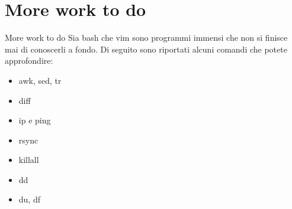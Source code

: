 \documentclass{beamer}
\begin{document}
\section{More work to do}
\begin{frame}{More work to do}
  Sia bash che vim sono programmi immensi che non si finisce mai di conoscerli a
  fondo. Di seguito sono riportati alcuni comandi che potete approfondire: 
  \medskip
  \begin{itemize}
    \item awk, sed, tr
    \item diff
    \item ip e ping
    \item rsync
    \item killall
    \item dd
    \item du, df
  \end{itemize}
\end{frame}
\end{document}
